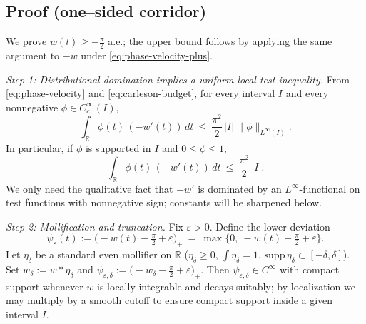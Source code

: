 \subsection*{Proof (one–sided corridor)}
We prove \(w(t)\ge -\tfrac{\pi}{2}\) a.e.; the upper bound follows by applying the same argument to \(-w\) under \eqref{eq:phase-velocity-plus}.


\medskip
\noindent\emph{Step 1: Distributional domination implies a uniform local test inequality.}
From \eqref{eq:phase-velocity} and \eqref{eq:carleson-budget}, for every interval \(I\) and every nonnegative \(\phi\in C_c^\infty(I)\),
\begin{equation}\label{eq:test-ineq}
\int_{\mathbb R} \phi(t)\,(-w'(t))\,dt\ \le\ \frac{\pi^2}{2}\,|I|\,\|\phi\|_{L^\infty(I)}.
\end{equation}
In particular, if \(\phi\) is supported in \(I\) and \(0\le \phi\le 1\),
\begin{equation}\label{eq:test-ineq-simple}
\int_{\mathbb R} \phi(t)\,(-w'(t))\,dt\ \le\ \frac{\pi^2}{2}\,|I|.
\end{equation}
We only need the qualitative fact that \(-w'\) is dominated by an \(L^\infty\)-functional on test functions with nonnegative sign; constants will be sharpened below.


\medskip
\noindent\emph{Step 2: Mollification and truncation.}
Fix \(\varepsilon>0\). Define the lower deviation
\[
 \psi_\varepsilon(t):=\bigl(-w(t)-\tfrac{\pi}{2}+\varepsilon\bigr)_+ \ =\ \max\!\bigl\{0,\ -w(t)-\tfrac{\pi}{2}+\varepsilon\bigr\}.
\]
Let \(\eta_\delta\) be a standard even mollifier on \(\mathbb R\) (\(\eta_\delta\ge 0\), \(\int\eta_\delta=1\), \(\mathrm{supp}\,\eta_\delta\subset[-\delta,\delta]\)). Set \(w_\delta:=w*\eta_\delta\) and \(\psi_{\varepsilon,\delta}:=\bigl(-w_\delta-\tfrac{\pi}{2}+\varepsilon\bigr)_+\). Then \(\psi_{\varepsilon,\delta}\in C^\infty\) with compact support whenever \(w\) is locally integrable and decays suitably; by localization we may multiply by a smooth cutoff to ensure compact support inside a given interval \(I\).


